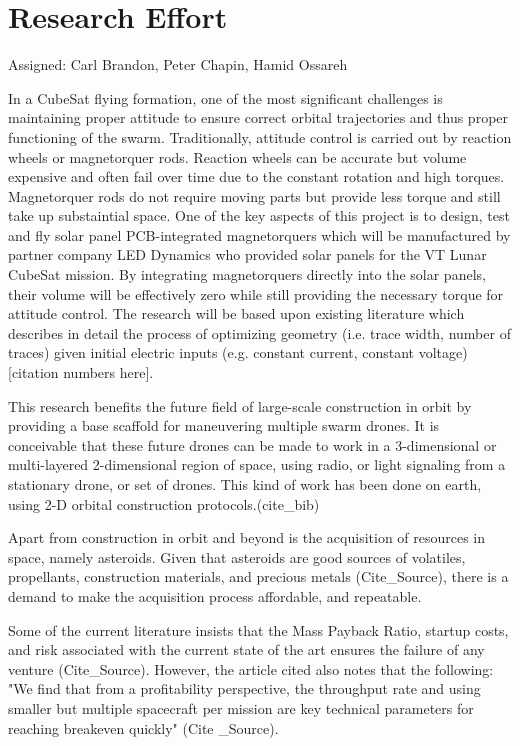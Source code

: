 \section{Research Effort}
Assigned: Carl Brandon, Peter Chapin, Hamid Ossareh

In a CubeSat flying formation, one of the most significant challenges
is maintaining proper attitude to ensure correct orbital trajectories
and thus proper functioning of the swarm. Traditionally, attitude
control is carried out by reaction wheels or magnetorquer
rods. Reaction wheels can be accurate but volume expensive and often
fail over time due to the constant rotation and high
torques. Magnetorquer rods do not require moving parts but provide
less torque and still take up substaintial space. One of the key
aspects of this project is to design, test and fly solar panel
PCB-integrated magnetorquers which will be manufactured by partner
company LED Dynamics who provided solar panels for the VT Lunar
CubeSat mission. By integrating magnetorquers directly into the solar
panels, their volume will be effectively zero while still providing
the necessary torque for attitude control. The research will be based
upon existing literature which describes in detail the process of
optimizing geometry (i.e. trace width, number of traces) given initial
electric inputs (e.g. constant current, constant voltage)[citation
  numbers here].

This research benefits the future field of large-scale construction in orbit by providing a base scaffold for maneuvering multiple swarm drones. It is conceivable that these  future drones can be made to work in a 3-dimensional or multi-layered 2-dimensional region of space, using radio, or light signaling from a stationary drone, or set of drones. This kind of work has been done on earth, using 2-D orbital construction protocols.(cite_bib)

Apart from construction in orbit and beyond is the acquisition of resources in space, namely asteroids. Given that asteroids are good sources of volatiles, propellants, construction materials, and precious metals (Cite_Source), there is a demand to make the acquisition process affordable, and repeatable.

Some of the current literature insists that the Mass Payback Ratio, startup costs, and risk associated with the current state of the art ensures the failure of any venture (Cite_Source). However, the article cited also notes that the following: "We find that from a profitability perspective, the throughput rate
and using smaller but multiple spacecraft per mission are key technical
parameters for reaching breakeven quickly" (Cite _Source).

